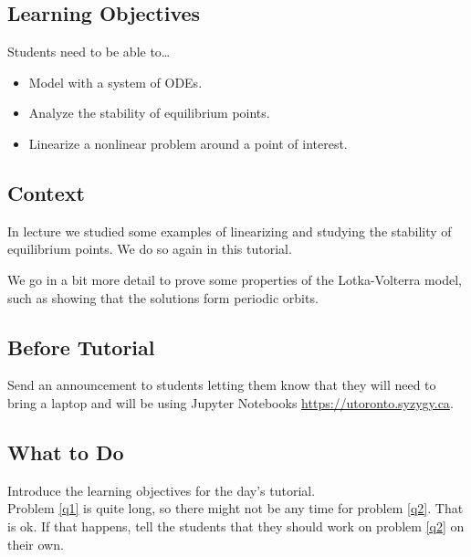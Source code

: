 \subsection*{Learning Objectives}
	Students need to be able to\ldots
		\begin{itemize}\it 
			\item Model with a system of ODEs. \\[-20pt]
			\item Analyze the stability of equilibrium points. \\[-20pt]
			\item Linearize a nonlinear problem around a point of interest.
		\end{itemize}


%	
\subsection*{Context}
	
In lecture we studied some examples  of linearizing and studying the stability of equilibrium points.
We do so again in this tutorial.

We go in a bit more detail to prove some properties of the Lotka-Volterra model, such as showing that the solutions form periodic orbits.






\subsection*{Before Tutorial}


Send an announcement to students letting them know that they will need to bring a laptop and will be using Jupyter Notebooks \url{https://utoronto.syzygy.ca}.


\subsection*{What to Do}
	
Introduce the learning objectives for the day's tutorial. \\

Problem \ref{q1} is quite long, so there might not be any time for problem \ref{q2}. That is ok. If that happens, tell the students that they should work on problem \ref{q2} on their own.


